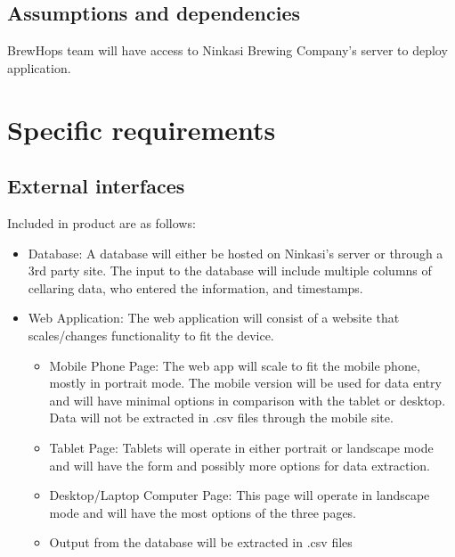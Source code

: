 \documentclass[draftclsnofoot,onecolumn,letterpaper,10pt,compsoc]{IEEEtran}
\begin{document}
	\subsection{Assumptions and dependencies}
    BrewHops team will have access to Ninkasi Brewing Company's server to deploy application.

\section{Specific requirements}
	\subsection{External interfaces}
    Included in product are as follows:
        \begin{itemize}
						\item{Database: A database will either be hosted on Ninkasi's server or through a 3rd party site.
						The input to the database will include multiple columns of cellaring data, who entered the information, and timestamps. }

            \item{Web Application:}
            The web application will consist of a website that scales/changes functionality to fit the device.

                \begin{itemize}
										\item{Mobile Phone Page: The web app will scale to fit the mobile phone, mostly in portrait mode.
										The mobile version will be used for data entry and will have minimal options in comparison with the tablet or desktop.
										Data will not be extracted in .csv files through the mobile site.}

                    \item{Tablet Page: Tablets will operate in either portrait or landscape mode and will have the form and possibly more options for data extraction.}

                    \item{Desktop/Laptop Computer Page: This page will operate in landscape mode and will have the most options of the three pages.}

                    \item{Output from the database will be extracted in .csv files}
                \end{itemize}
        \end{itemize}
\end{document}

